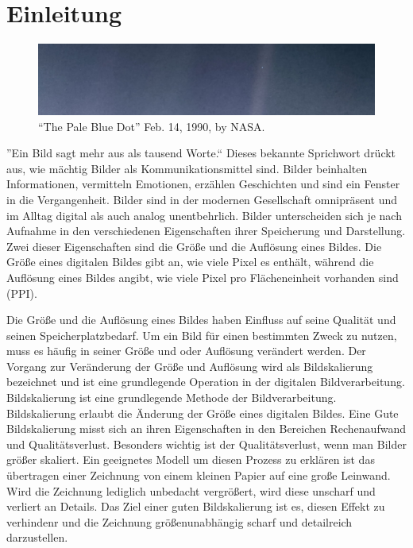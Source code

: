 



\chapter{Einleitung}

\begin{center}
\begin{figure}[h]
    \includegraphics[width=\textwidth]{img/PIA23645_PaleBlueDotRevisited_1600.jpg}
    \caption{``The Pale Blue Dot'' Feb. 14, 1990, by NASA\footnotemark.}
    \label{fig:my_label}
\end{figure}
\end{center}

''Ein Bild sagt mehr aus als tausend Worte.`` Dieses bekannte Sprichwort drückt aus, wie mächtig Bilder als Kommunikationsmittel sind. 
Bilder beinhalten Informationen, vermitteln Emotionen, erzählen Geschichten und sind ein Fenster in die Vergangenheit. 
Bilder sind in der modernen Gesellschaft omnipräsent und im Alltag digital als auch analog unentbehrlich.
Bilder unterscheiden sich je nach Aufnahme in den verschiedenen Eigenschaften ihrer Speicherung und Darstellung. 
Zwei dieser Eigenschaften sind die Größe und die Auflösung eines Bildes. 
Die Größe eines digitalen Bildes gibt an, wie viele Pixel es enthält, während die Auflösung eines Bildes angibt, wie viele Pixel pro Flächeneinheit vorhanden sind (PPI). 

Die Größe und die Auflösung eines Bildes haben Einfluss auf seine Qualität und seinen Speicherplatzbedarf. 
Um ein Bild für einen bestimmten Zweck zu nutzen, muss es häufig in seiner Größe und oder Auflösung verändert werden. 
Der Vorgang zur Veränderung der Größe und Auflösung wird als Bildskalierung bezeichnet und ist eine grundlegende Operation in der digitalen Bildverarbeitung.
Bildskalierung ist eine grundlegende Methode der Bildverarbeitung. Bildskalierung erlaubt die Änderung der Größe eines digitalen Bildes.
Eine Gute Bildskalierung misst sich an ihren Eigenschaften in den Bereichen Rechenaufwand und Qualitätsverlust. 
Besonders wichtig ist der Qualitätsverlust, wenn man Bilder größer skaliert. 
Ein geeignetes Modell um diesen Prozess zu erklären ist das übertragen einer Zeichnung von einem kleinen Papier auf eine große Leinwand. 
Wird die Zeichnung lediglich unbedacht vergrößert, wird diese unscharf und verliert an Details. 
Das Ziel einer guten Bildskalierung ist es, diesen Effekt zu verhindenr und die Zeichnung größenunabhängig scharf und detailreich darzustellen.

